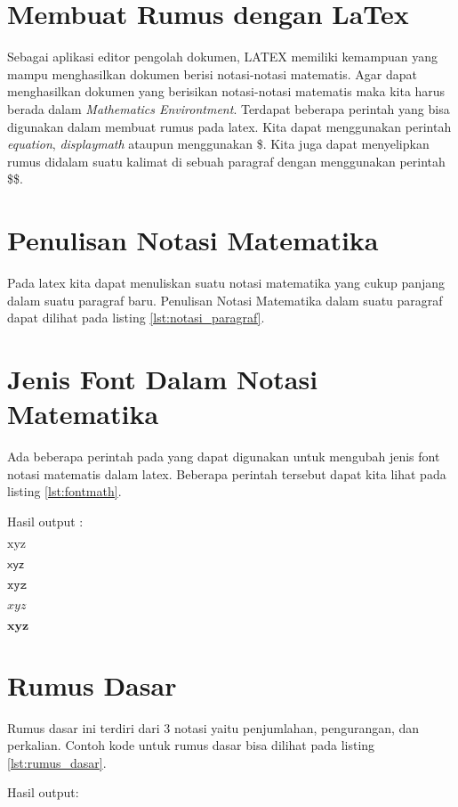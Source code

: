 \section{Membuat Rumus dengan LaTex}
Sebagai aplikasi editor pengolah dokumen, LATEX memiliki kemampuan yang mampu menghasilkan dokumen berisi notasi-notasi matematis. Agar dapat menghasilkan dokumen yang berisikan notasi-notasi matematis maka kita harus berada dalam \textit{Mathematics Environtment}. Terdapat beberapa perintah yang bisa digunakan dalam membuat rumus pada latex. Kita dapat menggunakan perintah \textit{equation}, \textit{displaymath} ataupun menggunakan \$. Kita juga dapat menyelipkan rumus didalam suatu kalimat di sebuah paragraf dengan menggunakan perintah \$\$.

\section{Penulisan Notasi Matematika}
Pada latex kita dapat menuliskan suatu notasi matematika yang cukup panjang dalam suatu paragraf baru. Penulisan Notasi Matematika dalam suatu paragraf dapat dilihat pada listing \ref{lst:notasi_paragraf}.


\section{Jenis Font Dalam Notasi Matematika}
Ada beberapa perintah pada yang dapat digunakan untuk mengubah jenis font notasi matematis dalam latex. Beberapa perintah tersebut dapat kita lihat pada listing \ref{lst:fontmath}.


Hasil output : 

$\mathrm{x y z}$

$\mathsf{x y z}$

$\mathtt{x y z}$

$\mathit{x y z}$

$\mathbf{x y z}$

\section{Rumus Dasar}
Rumus dasar ini terdiri dari 3 notasi yaitu penjumlahan, pengurangan, dan perkalian. Contoh kode untuk rumus dasar bisa dilihat pada listing \ref{lst:rumus_dasar}.

Hasil output:

